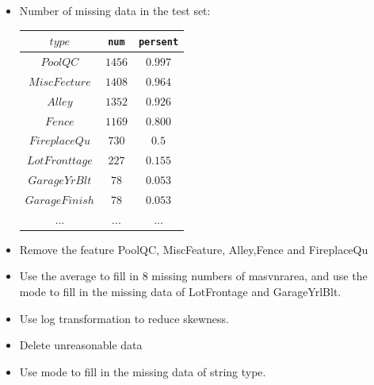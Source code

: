 \documentclass{tikzposter} %
\begin{document}
\begin{columns}
{\begin{itemize}
		\end{itemize}
		\begin{itemize}
			\item Number of missing data in the test set:
			\begin{center}
				\begin{tabular}{c c c }
					\toprule
					$type$ & \texttt{num}  & \texttt{persent} \\
					\midrule
					$PoolQC$ &  {$1456$} &  {$0.997$}   \\
					$MiscFecture$ &  {$1408$} &  {$0.964$}   \\
					$Alley$ &  {$1352$} &  {$0.926$}   \\
					$Fence$ &  {$1169$} &  {$0.800$}   \\
					$FireplaceQu$ &  {$730$} &  {$0.5$}   \\
					$LotFronttage$ &  {$227$} &  {$0.155$}   \\
					$GarageYrBlt$ &  {$78$} &  {$0.053$}   \\
					$GarageFinish$ &  {$78$} &  {$0.053$}   \\
					{$...$} &  {$...$}  &  {$...$}\\
					\bottomrule
				\end{tabular}
			\end{center}
			\item Remove the feature PoolQC, MiscFeature, Alley,Fence and FireplaceQu
			\item Use the average to fill in 8 missing numbers of masvnrarea, and use the mode to fill in the missing data of LotFrontage and GarageYrlBlt.
			\item Use log transformation to reduce skewness.
			\item Delete unreasonable data
			\item Use mode to fill in the missing data of string type.
		\end{itemize}
	}
\end{columns}
\end{document}
